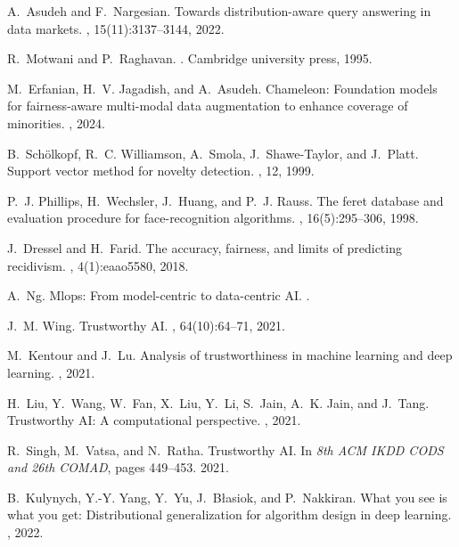 \documentclass[11pt]{article}
\begin{document}
\begin{thebibliography}{10}
A.~Asudeh and F.~Nargesian.
\newblock Towards distribution-aware query answering in data markets.
, 15(11):3137--3144, 2022.

R.~Motwani and P.~Raghavan.
.
\newblock Cambridge university press, 1995.

M.~Erfanian, H.~V. Jagadish, and A.~Asudeh.
\newblock Chameleon: Foundation models for fairness-aware multi-modal data augmentation to enhance coverage of minorities.
, 2024.

B.~Sch{\"o}lkopf, R.~C. Williamson, A.~Smola, J.~Shawe-Taylor, and J.~Platt.
\newblock Support vector method for novelty detection.
, 12, 1999.

P.~J. Phillips, H.~Wechsler, J.~Huang, and P.~J. Rauss.
\newblock The feret database and evaluation procedure for face-recognition algorithms.
, 16(5):295--306, 1998.

J.~Dressel and H.~Farid.
\newblock The accuracy, fairness, and limits of predicting recidivism.
, 4(1):eaao5580, 2018.

A.~Ng.
\newblock Mlops: From model-centric to data-centric {AI}.
.

J.~M. Wing.
\newblock Trustworthy {AI}.
, 64(10):64--71, 2021.

M.~Kentour and J.~Lu.
\newblock Analysis of trustworthiness in machine learning and deep learning.
, 2021.

H.~Liu, Y.~Wang, W.~Fan, X.~Liu, Y.~Li, S.~Jain, A.~K. Jain, and J.~Tang.
\newblock Trustworthy {AI}: A computational perspective.
, 2021.

R.~Singh, M.~Vatsa, and N.~Ratha.
\newblock Trustworthy {AI}.
\newblock In {\em 8th ACM IKDD CODS and 26th COMAD}, pages 449--453. 2021.

B.~Kulynych, Y.-Y. Yang, Y.~Yu, J.~B{\l}asiok, and P.~Nakkiran.
\newblock What you see is what you get: Distributional generalization for algorithm design in deep learning.
, 2022.


\end{thebibliography}
\end{document}
